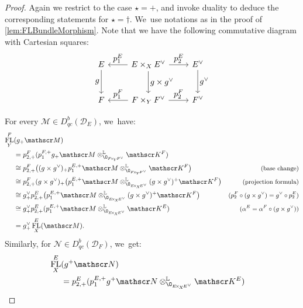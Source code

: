 \documentclass[JEP,XML,SOM,Unicode,published]{cedram}
\let\ts\textstyle
\DeclareMathOperator{\FL}{\textup{FL}}
\begin{document}
\begin{proof}
Again we restrict to the case
$\star=+$, and invoke duality to deduce the corresponding statements for $\star=\dag$. We~use notations as in the proof of \cref{lem:FLBundleMorphism}. Note that we have the following commutative diagram with Cartesian squares:\vspace*{-5pt}
\[
\begin{tikzcd}[row sep=large]
E \ar[swap]{d}{\ts g} & E \times_X E^\vee \ar{l}[swap]{\ts p_1^E} \ar{r}{\ts p_2^E} \ar{d}{\ts g \times g^\vee} & E^\vee \ar{d}{\ts g^\vee} \\
F & F \times_Y F^\vee \ar{l}[swap]{\ts p_1^F} \ar{r}{\ts p_2^F} & F^\vee
\end{tikzcd}
\]
\vspace*{-.5\baselineskip}\par
\noindent 
For every $\mathscr M \in D_{qc}^b(\mathscr D_E)$, we~have:\vspace*{-5pt}
\begin{align*}
\FL_Y^F&(g_+ \mathscr M) & \\
&= p_{2,+}^F (p_1^{F,+} g_+ \mathscr M \otimes^{\mathbb L}_{\O_{F\!\times_{\!Y}\!F^\vee}} \mathscr K^F) & \\
&\cong p_{2,+}^F \big((g \times g^\vee)_+ p_1^{E,+} \mathscr M \otimes^{\mathbb L}_{\O_{F\!\times_{\!Y}\!F^\vee}} \mathscr K^F\big) & \text{\small (base change)} \\
&\cong p_{2,+}^F (g \times g^\vee)_+ \big(p_1^{E,+} \mathscr M \otimes^{\mathbb L}_{\O_{E\!\times_{\!X}\!E^\vee}} (g \times g^\vee)^+\mathscr K^F\big) & \text{\small (projection formula)} \\
&\cong g^\vee_+ p_{2,+}^E \big(p_1^{E,+} \mathscr M \otimes^{\mathbb L}_{\O_{E\!\times_{\!X}\!E^\vee}} (g \times g^\vee)^+\mathscr K^F\big) & \text{\small ($p_2^F \circ (g \times g^\vee) = g^\vee \circ p_2^E$)} \\
&\cong g^\vee_+ p_{2,+}^E (p_1^{E,+} \mathscr M \otimes^{\mathbb L}_{\O_{E\!\times_{\!X}\!E^\vee}} \mathscr K^E) & \text{\small ($\alpha^E = \alpha^F \circ (g \times g^\vee)$)} \\
&= g_+^\vee \FL_X^E(\mathscr M).
\end{align*}
Similarly, for $\mathscr N \in D_{qc}^b(\mathscr D_F)$, we~get:\vspace*{-3pt}
\begin{align*}
\FL_X^E&(g^+ \mathscr N) & \\
&= p_{2,+}^E (p_1^{E,+} g^+ \mathscr N \otimes^{\mathbb L}_{\O_{E\!\times_{\!X}\!E^\vee}} \mathscr K^E) & \\

\end{align*}
\end{proof}
\end{document}
